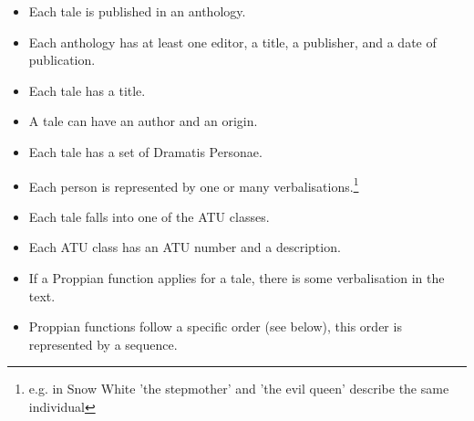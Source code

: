 \documentclass[10pt,a4paper]{article}
\begin{document}
\begin{itemize}
		\item Each tale is published in an anthology. 
		\item Each anthology has at least one editor, a title, a publisher, and a date of publication.
		\item Each tale has a title.
		\item A tale can have an author and an origin.  
		\item Each tale has a set of Dramatis Personae. 
		\item Each person is represented by one or many verbalisations.\footnote{e.g. in Snow White 'the stepmother' and 'the evil queen' describe the same individual} 
		\item Each tale falls into one of the ATU classes. 
		\item Each ATU class has an ATU number and a description. 
		\item If a Proppian function applies for a tale, there is some verbalisation in the text. 
		\item Proppian functions follow a specific order (see below), this order is represented by a sequence. 
\end{itemize}
		
\end{document}
